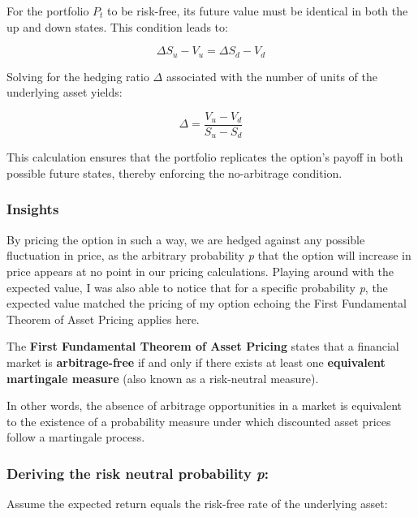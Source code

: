 \documentclass{article}
\begin{document}
    \medskip

    For the portfolio \( P_t \) to be risk-free, its future value must be identical in both the up and down states. This condition leads to:

    \[
        \Delta S_u - V_u = \Delta S_d - V_d
    \]

    Solving for the hedging ratio \( \Delta \) associated with the number of units of the underlying asset yields:

    \[
        \Delta = \frac{V_u - V_d}{S_u - S_d}
    \]

    This calculation ensures that the portfolio replicates the option's payoff in both possible future states, thereby enforcing the no-arbitrage condition.

    \subsubsection{Insights}

    By pricing the option in such a way, we are hedged against any possible fluctuation in price, as the arbitrary probability \emph{p} that the option will increase in price appears at no point in our pricing calculations.
    Playing around with the expected value, I was also able to notice that for a specific probability \emph{p}, the expected value matched the pricing of my option echoing the First Fundamental Theorem of Asset Pricing applies here.

    \begin{tcolorbox}[note, title=First Fundamental Theorem of Asset Pricing]
        The \textbf{First Fundamental Theorem of Asset Pricing} states that a financial market is \textbf{arbitrage-free} if and only if there exists at least one \textbf{equivalent martingale measure} (also known as a risk-neutral measure).

        In other words, the absence of arbitrage opportunities in a market is equivalent to the existence of a probability measure under which discounted asset prices follow a martingale process.
    \end{tcolorbox}

    \bigskip

    \subsubsection*{Deriving the risk neutral probability \emph{p}:}

    Assume the expected return equals the risk-free rate of the underlying asset:
\end{document}
